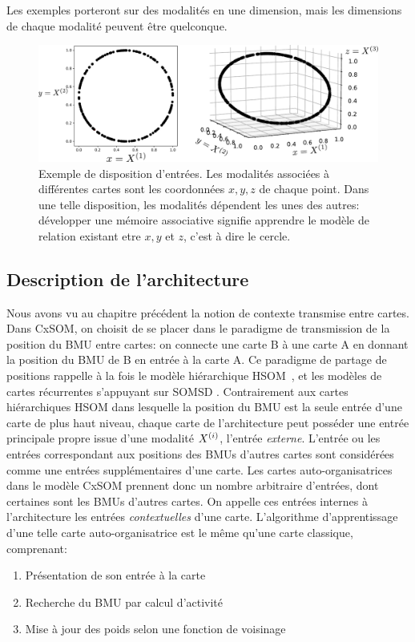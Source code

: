 Les exemples porteront sur des modalités en une dimension, mais les dimensions de chaque modalité peuvent être quelconque.

\begin{figure}
\centering
\includegraphics[width=\textwidth]{inputs_3som}
\caption{Exemple de disposition d'entrées. Les modalités associées à différentes cartes sont les coordonnées $x,y,z$ de chaque point. Dans une telle disposition, les modalités dépendent les unes des autres: développer une mémoire associative signifie apprendre le modèle de relation existant etre $x,y$ et $z$, c'est à dire le cercle.}
\end{figure}

\subsection{Description de l'architecture}
Nous avons vu au chapitre précédent la notion de contexte transmise entre cartes. Dans CxSOM, on choisit de se placer dans le paradigme de transmission de la position du BMU entre cartes: on connecte une carte B à une carte A en donnant la position du BMU de B en entrée à la carte A. 
Ce paradigme de partage de positions rappelle à la fois le modèle hiérarchique HSOM~\cite{lampinen_clustering_1992}, et les modèles de cartes récurrentes s'appuyant sur SOMSD \cite{hammer_recursive_2004,hagenbuchner_self-organizing_2003,fix20}.
Contrairement aux cartes hiérarchiques HSOM dans lesquelle la position du BMU est la seule entrée d'une carte de plus haut niveau, chaque carte de l'architecture peut posséder une entrée principale propre issue d'une modalité $X^{({i})}$, l'entrée \emph{externe}. L'entrée ou les entrées correspondant aux positions des BMUs d'autres cartes sont considérées comme une entrées supplémentaires d'une carte. Les cartes auto-organisatrices dans le modèle CxSOM prennent donc un nombre arbitraire d'entrées, dont certaines sont les BMUs d'autres cartes. On appelle ces entrées internes à l'architecture les entrées \emph{contextuelles} d'une carte.
L'algorithme d'apprentissage d'une telle carte auto-organisatrice est le même qu'une carte classique, comprenant:
\begin{enumerate}
\item\label{etape:entree} Présentation de son entrée à la carte 
\item\label{etape:bmu} Recherche du BMU par calcul d'activité
\item\label{etape:maj} Mise à jour des poids selon une fonction de voisinage
\end{enumerate}

